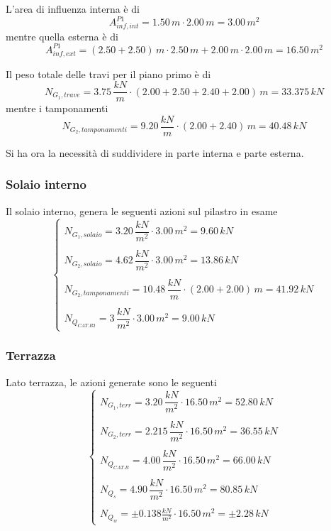 L'area di influenza interna è di
\[
	A_{inf,int}^{P1} = 1.50\,m\cdot2.00\,m = 3.00\,m^2
\]
mentre quella esterna è di 
\[
	A_{inf, ext}^{P1} = (2.50+2.50)\,m \cdot 2.50\,m  + 2.00\,m \cdot 2.00\,m = 16.50\,m^2
\]

Il peso totale delle travi per il piano primo è di
\[
	N_{G_1, trave} = 3.75\,\dfrac{kN}{m}\cdot (2.00 + 2.50 + 2.40 + 2.00)\,m = 33.375\,kN
\]
mentre i tamponamenti
\[
	N_{G_2, tamponamenti} = 9.20\,\dfrac{kN}{m} \cdot (2.00 +2.40)\,m = 40.48\,kN
\]


Si ha ora la necessità di suddividere in parte interna e parte esterna.

\subsubsection*{Solaio interno}
Il solaio interno, genera le seguenti azioni sul pilastro in esame
\[
	\begin{cases}
		N_{G_1, solaio} = 3.20\,\dfrac{kN}{m^2} \cdot 3.00\,m^2 = 9.60\,kN\\\\
		N_{G_2, solaio} = 4.62\,\dfrac{kN}{m^2} \cdot 3.00\,m^2 = 13.86\,kN\\\\
		N_{G_2, tamponamenti} = 10.48\,\dfrac{kN}{m} \cdot (2.00 + 2.00)\,m = 41.92\,kN\\\\
		N_{Q_{CAT.B2}} = 3\,\dfrac{kN}{m^2} \cdot 3.00\,m^2 = 9.00\,kN
	\end{cases}
\]

\subsubsection*{Terrazza}
Lato terrazza, le azioni generate sono le seguenti
\[
	\begin{cases}
		N_{G_1, terr} = 3.20\,\dfrac{kN}{m^2} \cdot 16.50\,m^2 = 52.80\,kN\\\\
		N_{G_2, terr} = 2.215\,\dfrac{kN}{m^2} \cdot 16.50\,m^2 = 36.55\,kN\\\\
		N_{Q_{CAT.B}} = 4.00\,\dfrac{kN}{m^2} \cdot 16.50\,m^2 = 66.00\,kN\\\\
		N_{Q_{s}} = 4.90\,\dfrac{kN}{m^2} \cdot 16.50\,m^2 = 80.85\,kN\\\\
		N_{Q_{w}} = \pm0.138\frac{kN}{m^2} \cdot 16.50\,m^2 = \pm 2.28\,kN
	\end{cases}
\]

